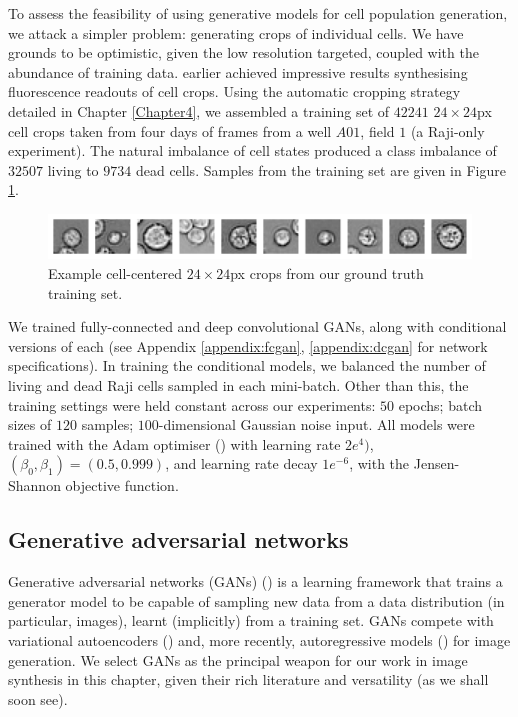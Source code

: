 To assess the feasibility of using generative models for cell population generation, we attack a simpler problem: generating crops of individual cells. We have grounds to be optimistic, given the low resolution targeted, coupled with the abundance of training data. \cite{osokin2017gans} earlier achieved impressive results synthesising fluorescence readouts of cell crops. Using the automatic cropping strategy detailed in Chapter \ref{Chapter4}, we assembled a training set of $42241$ $24 \times 24$px cell crops taken from four days of frames from a well $A01$, field $1$ (a Raji-only experiment). The natural imbalance of cell states produced a class imbalance of $32507$ living to $9734$ dead cells. Samples from the training set are given in Figure \ref{fig:reference_samples}.

\begin{figure}[h]
\centering
\includegraphics[width=\textwidth]{img/feasibility_reference_samples.pdf}
\caption{Example cell-centered $24\times 24$px crops from our ground truth training set.}
\label{fig:reference_samples}
\end{figure}

We trained fully-connected and deep convolutional GANs, along with conditional versions of each (see Appendix \ref{appendix:fcgan}, \ref{appendix:dcgan} for network specifications). In training the conditional models, we balanced the number of living and dead Raji cells sampled in each mini-batch. Other than this, the training settings were held constant across our experiments: $50$ epochs; batch sizes of $120$ samples; $100$-dimensional Gaussian noise input. All models were trained with the Adam optimiser (\cite{kingma2014adam}) with learning rate $2e^{4})$, $(\beta_0, \beta_1) = (0.5, 0.999)$, and learning rate decay $1e^{-6}$, with the Jensen-Shannon objective function.

\subsection{Generative adversarial networks}


Generative adversarial networks (GANs) (\cite{goodfellow2014generative}) is a learning framework that trains a generator model to be capable of sampling new data from a data distribution (in particular, images), learnt (implicitly) from a training set. GANs compete with variational autoencoders (\cite{kingma2013auto}) and, more recently, autoregressive models (\cite{oord2016pixel}) for image generation. We select GANs as the principal weapon for our work in image synthesis in this chapter, given their rich literature and versatility (as we shall soon see).

